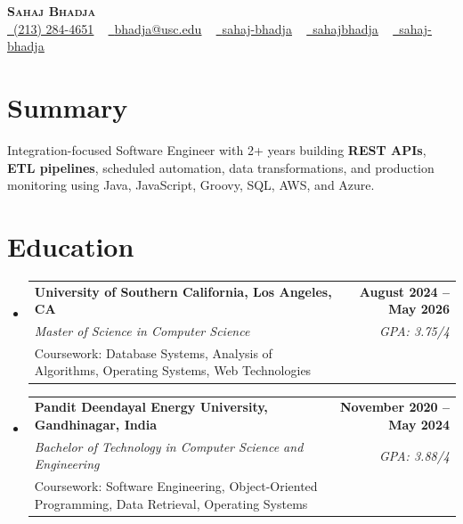 \documentclass[letterpaper,10pt]{article}
\makeatletter
\newcommand{\sectionGap}{\vspace{-8pt}}
\newcommand{\resumeEduSubheading}[5]{\vspace{-1pt}\item\begin{tabular*}{1.0\textwidth}[t]{l@{\extracolsep{\fill}}r}\textbf{#1} & \textbf{\small #2} \\\textit{\small #3} & \textit{\small #4} \\\small #5 & \\\end{tabular*}\vspace{-4pt}}
\newcommand{\resumeSubHeadingListStart}{\begin{itemize}[leftmargin=0.0in, label={}]}
\newcommand{\resumeSubHeadingListEnd}{\end{itemize}}
\makeatother
\begin{document}
\begin{center}
{\Huge \scshape \textbf{Sahaj Bhadja}} \\ \vspace{1pt}
\small \href{tel:2132844651}{\faPhone\ \underline{(213) 284-4651}} ~ \href{mailto:bhadja@usc.edu}{\raisebox{-0.2\height}\faEnvelope\ \underline{bhadja@usc.edu}} ~
\href{https://www.linkedin.com/in/sahaj-bhadja/}{\raisebox{-0.2\height}\faLinkedin\ \underline{sahaj-bhadja}} ~ \href{https://github.com/SAHAJ-BHADJA}{\raisebox{-0.2\height}\faGithub\ \underline{sahajbhadja}} ~
\href{https://sahaj-bhadja.vercel.app/}{\raisebox{-0.2\height}\faGlobe\ \underline{sahaj-bhadja}}
\end{center}
\vspace{-16pt}
\section{Summary}
\begin{itemize}[leftmargin=0.15in, label={}]
\small{\item{Integration-focused Software Engineer with 2+ years building \textbf{REST APIs}, \textbf{ETL pipelines}, scheduled automation, data transformations, and production monitoring using Java, JavaScript, Groovy, SQL, AWS, and Azure.}}
\end{itemize}
\sectionGap
\section{Education}
\resumeSubHeadingListStart
\resumeEduSubheading{University of Southern California, Los Angeles, CA}{August 2024 -- May 2026}{Master of Science in Computer Science}{GPA: 3.75/4}{Coursework: Database Systems, Analysis of Algorithms, Operating Systems, Web Technologies}
\resumeEduSubheading{Pandit Deendayal Energy University, Gandhinagar, India}{November 2020 -- May 2024}{Bachelor of Technology in Computer Science and Engineering}{GPA: 3.88/4}{Coursework: Software Engineering, Object-Oriented Programming, Data Retrieval, Operating Systems}
\resumeSubHeadingListEnd
\sectionGap
\end{document}
